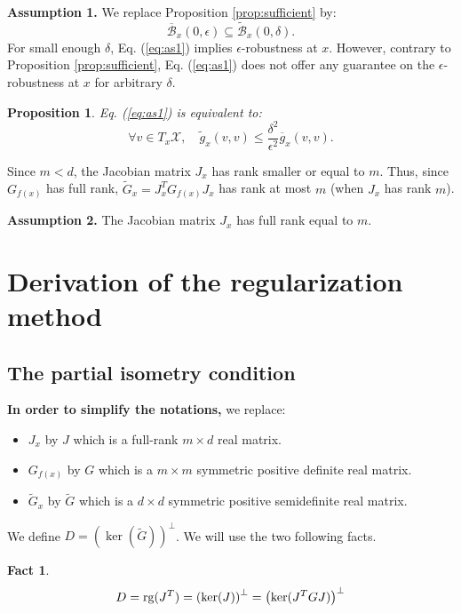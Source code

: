 \documentclass[entropy,article,submit,pdftex,moreauthors]{Definitions/mdpi}
\theoremstyle{plain}
\newtheorem{proposition}[theorem]{Proposition}
\theoremstyle{definition}
\newtheorem{fact}[theorem]{Fact}
\newcommand{\B}{\mathcal{B}}
\newcommand{\X}{\mathcal{X}}
\newcommand{\rg}{\textnormal{rg}}
\newcommand{\gb}{\overline{g}}
\begin{document}
\noindent \textbf{Assumption 1.} We replace Proposition \ref{prop:sufficient} by:
\begin{equation}
\label{eq:as1}
    \overline{\B}_x(0, \epsilon) \subseteq \widetilde{\B}_x(0, \delta).
\end{equation}
For small enough $\delta$, Eq. (\ref{eq:as1}) implies $\epsilon$-robustness at $x$. However, contrary to Proposition \ref{prop:sufficient}, Eq. (\ref{eq:as1}) does not offer any guarantee on the $\epsilon$-robustness at $x$ for arbitrary $\delta$.
\begin{proposition}
\label{prop:as1}
    Eq. (\ref{eq:as1}) is equivalent to:
    \begin{equation}
        \label{eq:as1-2}
        \forall v \in T_x\X, \quad \tilde{g}_x(v,v) \leq \frac{\delta^2}{\epsilon^2} \gb_x(v,v).
    \end{equation}
\end{proposition}
Since $m < d$, the Jacobian matrix $J_x$ has rank smaller or equal to $m$. Thus, since $G_{f(x)}$ has full rank, $\widetilde{G}_x = J_x^T G_{f(x)} J_x$ has rank at most $m$ (when $J_x$ has rank $m$).

\noindent \textbf{Assumption 2.} The Jacobian matrix $J_x$ has full rank equal to $m$.

\section{Derivation of the regularization method}
\label{sec:cond}

\subsection{The partial isometry condition}

\noindent \textbf{In order to simplify the notations,} we replace:
\begin{itemize}
    \item $J_x$ by $J$ which is a full-rank $m \times d$ real matrix.
    \item $G_{f(x)}$ by $G$ which is a $m \times m$ symmetric positive definite real matrix.
    \item $\widetilde{G}_x$ by $\widetilde{G}$ which is a $d \times d$ symmetric positive semidefinite real matrix.
\end{itemize}
We define $D = (\ker(\widetilde{G}))^\perp$. We will use the two following facts.
\begin{fact}
\label{fact1}
    \begin{equation*}
        D = \rg(J^T) = \left(\ker(J)\right)^\perp = \left(\ker(J^T G J)\right)^\perp
    \end{equation*}
\end{fact}
\end{document}
